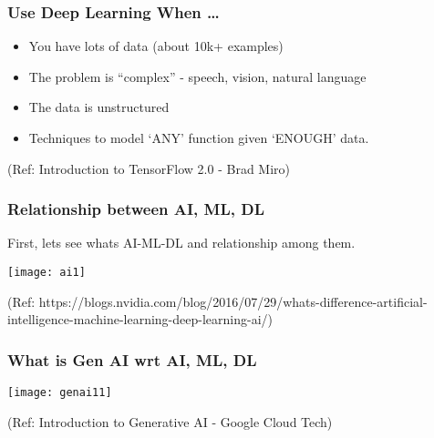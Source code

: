 \begin{frame}[fragile] \frametitle{Use Deep Learning When \ldots}

\begin{itemize}
\item You have lots of data (about 10k+ examples)
\item The problem is ``complex'' - speech, vision, natural language
\item The data is unstructured 
\item Techniques to model `ANY' function given `ENOUGH' data.
\end{itemize}
\tiny{(Ref: Introduction to TensorFlow 2.0 - Brad Miro)}
\end{frame}


\begin{frame}[fragile]\frametitle{Relationship between AI, ML, DL}

First, lets see whats AI-ML-DL and relationship among them.

\begin{center}
\texttt{[image: ai1]}
\end{center}

{\tiny (Ref: https://blogs.nvidia.com/blog/2016/07/29/whats-difference-artificial-intelligence-machine-learning-deep-learning-ai/)}

\end{frame}

\begin{frame}[fragile]\frametitle{What is Gen AI wrt AI, ML, DL}

\begin{center}
\texttt{[image: genai11]}
\end{center}

{\tiny (Ref: Introduction to Generative AI - Google Cloud Tech)}

\end{frame}

